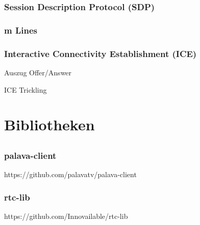 \documentclass[12pt]{beamer}
\begin{document}
\begin{frame}
  \frametitle{Session Description Protocol (SDP)}
  \pause
  \begin{multicols}{2}
    
  \end{multicols}
\end{frame}

\begin{frame}
  \frametitle{m Lines}



\end{frame}

\begin{frame}
  \frametitle{Interactive Connectivity Establishment (ICE)}
  \pause
  
  \hfill \tiny Auszug Offer/Answer
  \vspace{15pt}
  \pause
  
  
  \hfill \tiny ICE Trickling
\end{frame}


\section{Bibliotheken}
\subsection{} 

\begin{frame}
  \frametitle{palava-client}
  \pause
  
  \hfill \tiny https://github.com/palavatv/palava-client
\end{frame}

\begin{frame}
  \frametitle{rtc-lib}
  \pause
  
  \hfill \tiny https://github.com/Innovailable/rtc-lib
\end{frame}
\end{document}
